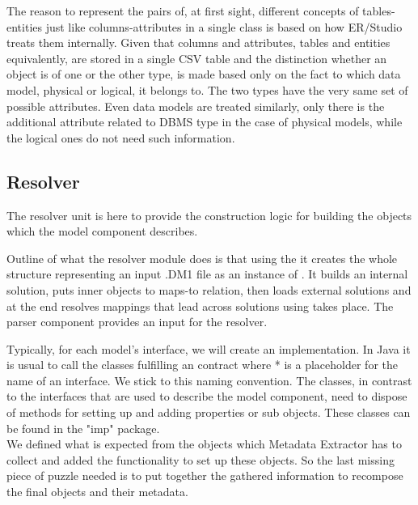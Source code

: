 The reason to represent the pairs of, at first sight, different concepts of tables-entities just like columns-attributes in a single class is based on how ER/Studio treats them internally. Given that columns and attributes, tables and entities equivalently, are stored in a single CSV table and the distinction whether an object is of one or the other type, is made based only on the fact to which data model, physical or logical, it belongs to.
The two types have the very same set of possible attributes. 
Even data models are treated similarly, only there is the additional attribute related to DBMS type in the case of physical models, while the logical ones do not need such information.

\subsection{Resolver}

The resolver unit is here to provide the construction logic for building the objects which the model component describes.

Outline of what the resolver module does is that using the  it creates the whole structure representing an input .DM1 file as an instance of . 
It builds an internal solution, puts inner objects to maps-to relation, then loads external solutions and at the end resolves mappings that lead across solutions using  takes place.
The parser component provides an input for the resolver.

Typically, for each model's interface, we will create an implementation. 
In Java it is usual to call the classes fulfilling an contract  where * is a placeholder for the name of an interface. We stick to this naming convention. 
The  classes, in contrast to the interfaces that are used to describe the model component, need to dispose of methods for setting up and adding properties or sub objects. These classes can be found in the "imp" package. \\

We defined what is expected from the objects which Metadata Extractor has to collect and added the functionality to set up these objects.
So the last missing piece of puzzle needed is to put together the gathered information to recompose the final objects and their metadata.


